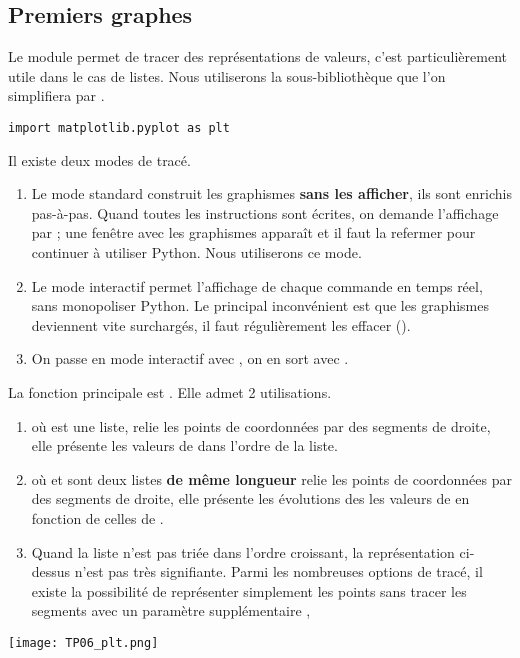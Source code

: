 \subsection{Premiers graphes} 
Le module  permet de tracer des représentations de valeurs, c'est particulièrement utile dans le cas de listes. Nous utiliserons la sous-bibliothèque  que l'on simplifiera par .
\begin{lstlisting}
import matplotlib.pyplot as plt
\end{lstlisting}

Il existe deux modes de tracé.
\begin{enumerate}
    \item Le mode standard construit les graphismes {\bf sans les afficher}, ils sont enrichis pas-à-pas. Quand toutes les instructions sont écrites, on demande l'affichage par  ; une fenêtre avec les graphismes apparaît et il faut la refermer pour continuer à utiliser Python. Nous utiliserons ce mode.
    \item Le mode interactif permet l'affichage de chaque commande en temps réel, sans monopoliser Python. Le principal inconvénient est que les graphismes deviennent vite surchargés, il faut régulièrement les effacer (). 
    \item On passe en mode interactif avec , on en sort avec .
\end{enumerate}

\medskip

La fonction principale est . Elle admet 2 utilisations.
\begin{enumerate}
    \item {} où  est une liste, relie les points de coordonnées  par des segments de droite, elle présente les valeurs de  dans l'ordre de la liste.
    \item {} où  et  sont deux listes {\bf de même longueur} relie les points de coordonnées  par des segments de droite, elle présente les évolutions des les valeurs de  en fonction de celles de .
    \item Quand la liste n'est pas triée dans l'ordre croissant, la représentation ci-dessus n'est pas très signifiante. Parmi les nombreuses options de tracé, il existe la possibilité de représenter simplement les points sans tracer les segments avec un paramètre supplémentaire , 
\end{enumerate}
\begin{center}
\texttt{[image: TP06\_plt.png]} 
\end{center}

